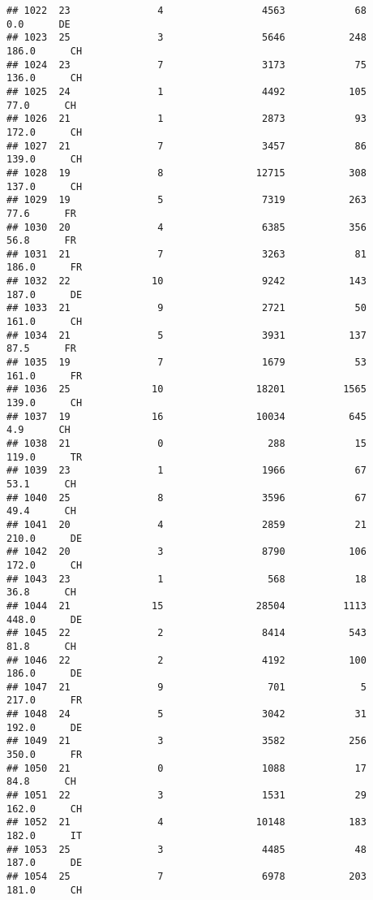 \documentclass[
]{article}
\begin{document}
\begin{verbatim}
## 1022  23               4                 4563            68      0.0      DE
## 1023  25               3                 5646           248    186.0      CH
## 1024  23               7                 3173            75    136.0      CH
## 1025  24               1                 4492           105     77.0      CH
## 1026  21               1                 2873            93    172.0      CH
## 1027  21               7                 3457            86    139.0      CH
## 1028  19               8                12715           308    137.0      CH
## 1029  19               5                 7319           263     77.6      FR
## 1030  20               4                 6385           356     56.8      FR
## 1031  21               7                 3263            81    186.0      FR
## 1032  22              10                 9242           143    187.0      DE
## 1033  21               9                 2721            50    161.0      CH
## 1034  21               5                 3931           137     87.5      FR
## 1035  19               7                 1679            53    161.0      FR
## 1036  25              10                18201          1565    139.0      CH
## 1037  19              16                10034           645      4.9      CH
## 1038  21               0                  288            15    119.0      TR
## 1039  23               1                 1966            67     53.1      CH
## 1040  25               8                 3596            67     49.4      CH
## 1041  20               4                 2859            21    210.0      DE
## 1042  20               3                 8790           106    172.0      CH
## 1043  23               1                  568            18     36.8      CH
## 1044  21              15                28504          1113    448.0      DE
## 1045  22               2                 8414           543     81.8      CH
## 1046  22               2                 4192           100    186.0      DE
## 1047  21               9                  701             5    217.0      FR
## 1048  24               5                 3042            31    192.0      DE
## 1049  21               3                 3582           256    350.0      FR
## 1050  21               0                 1088            17     84.8      CH
## 1051  22               3                 1531            29    162.0      CH
## 1052  21               4                10148           183    182.0      IT
## 1053  25               3                 4485            48    187.0      DE
## 1054  25               7                 6978           203    181.0      CH

\end{verbatim}
\end{document}
